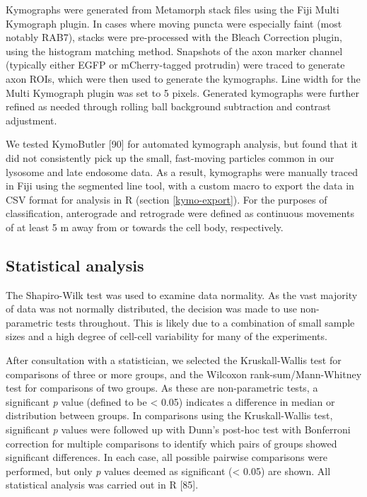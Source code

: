 \documentclass[
  12pt,
  a4paper,
]{book}
\begin{document}
Kymographs were generated from Metamorph stack files using the Fiji Multi Kymograph plugin. In cases where moving puncta were especially faint (most notably RAB7), stacks were pre-processed with the Bleach Correction plugin, using the histogram matching method. Snapshots of the axon marker channel (typically either EGFP or mCherry-tagged protrudin) were traced to generate axon ROIs, which were then used to generate the kymographs. Line width for the Multi Kymograph plugin was set to 5 pixels. Generated kymographs were further refined as needed through rolling ball background subtraction and contrast adjustment.

We tested KymoButler {[}90{]} for automated kymograph analysis, but found that it did not consistently pick up the small, fast-moving particles common in our lysosome and late endosome data. As a result, kymographs were manually traced in Fiji using the segmented line tool, with a custom macro to export the data in CSV format for analysis in R (section \ref{kymo-export}). For the purposes of classification, anterograde and retrograde were defined as continuous movements of at
least 5 \textmu{}m away from or towards the cell body, respectively.

\hypertarget{statistical-analysis}{%
\subsection{Statistical analysis}\label{statistical-analysis}}

The Shapiro-Wilk test was used to examine data normality. As the vast majority of data was not normally distributed, the decision was made to use non-parametric tests throughout. This is likely due to a combination of small sample sizes and a high degree of cell-cell variability for many of the experiments.

After consultation with a statistician, we selected the Kruskall-Wallis test for comparisons of three or more groups, and the Wilcoxon rank-sum/Mann-Whitney test for comparisons of two groups. As these are non-parametric tests, a significant \emph{p} value (defined to be \textless{} 0.05) indicates a difference in median or distribution between groups. In comparisons using the Kruskall-Wallis test, significant \emph{p} values were followed up with Dunn's post-hoc test with Bonferroni correction for multiple comparisons to identify which pairs of groups showed significant differences. In each case, all possible pairwise comparisons were performed, but only \emph{p} values deemed as significant (\textless{} 0.05) are shown. All statistical analysis was carried out in R {[}85{]}.
\end{document}
